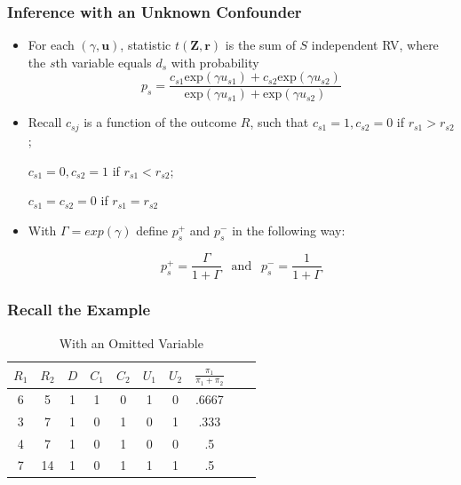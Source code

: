 \documentclass{beamer}
\begin{document}
\begin{frame}[c]\frametitle{Inference with an Unknown Confounder}
	\begin{itemize}
		\item<+-> For each $(\gamma, \mathbf{u})$, statistic $t(\mathbf{Z,r})$ is the sum of $S$ independent RV, where the $s$th variable equals $d_s$ with probability 
		\[
		p_s = \frac{c_{s1}\textrm{exp}(\gamma u_{s1}) + c_{s2}\textrm{exp}(\gamma u_{s2})}{\textrm{exp}(\gamma u_{s1}) + \textrm{exp}(\gamma u_{s2})}
		\]
\item<+-> Recall $c_{sj}$ is a function of the outcome $R$, such that
  $c_{s1}=1,c_{s2}=0$ if $r_{s1}>r_{s2}$;   

$c_{s1}=0,c_{s2}=1$ if
  $r_{s1}<r_{s2}$;

$c_{s1}= c_{s2}=0$ if
  $r_{s1}=r_{s2}$
\vspace{.2em}
		\item<+-> With $\Gamma = exp(\gamma)$ define $p^{+}_s$ and $p_s^-$ in the following way:

   $$     p_s^+=\frac{\Gamma}{1+\Gamma}\ \ \text{ and }\ \        p_s^-=\frac{1}{1+\Gamma}  $$

	\end{itemize}
\end{frame}


\begin{frame}[c]\frametitle{Recall the Example}
	\begin{table}
		\begin{center}
			\begin{tabular}{cccccccccc}
				$R_1$ & $R_2$ & $D$ & $C_1$ &$C_2$  & $U_1$ & $U_2$ & $\frac{\pi_1}{\pi_1 + \pi_2}$ \\ \hline
				6 & 5 & 1 & 1 & 0  & 1 & 0 &  .6667\\
				3 & 7 & 1 & 0 & 1  & 0 & 1 & .333  \\
				4 & 7 & 1 & 0 & 1  & 0 & 0 &  .5\\
				7 & 14 & 1 & 0 & 1  & 1 & 1 & .5 \\
			\end{tabular}
		\end{center}
		\caption{With an Omitted Variable}
	\end{table}
\end{frame}
\end{document}
